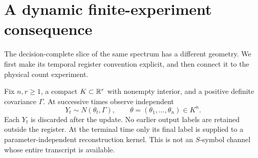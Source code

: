 \section{A dynamic finite-experiment consequence}\label{sec:v8-gaussian}
The decision-complete slice of the same spectrum has a different
geometry. We first make its temporal register convention explicit, and
then connect it to the physical count experiment.

Fix $n,r\ge1$, a compact $K\subset\mathbb R^r$ with nonempty interior, and a
positive definite covariance $\Gamma$. At successive times observe
independent
\begin{equation}
 Y_t\sim N(\theta_t,\Gamma),\qquad
                 \theta=(\theta_1,\ldots,\theta_n)\in K^n.
                                                        \label{eq:v8-seqgaussian}
\end{equation}
Each $Y_t$ is discarded after the update. No earlier output labels are
retained outside the register. At the terminal time only its final label
is supplied to a parameter-independent reconstruction kernel. This is
not an $S$-symbol channel whose entire transcript is available.

